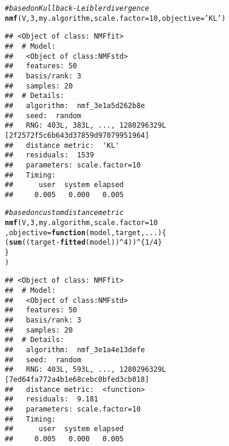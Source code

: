 \documentclass[a4paper]{article}\usepackage[]{graphicx}\usepackage[]{color}
\makeatletter
\newcommand{\hlnum}[1]{\textcolor[rgb]{0.686,0.059,0.569}{#1}}%
\newcommand{\hlstr}[1]{\textcolor[rgb]{0.192,0.494,0.8}{#1}}%
\newcommand{\hlcom}[1]{\textcolor[rgb]{0.678,0.584,0.686}{\textit{#1}}}%
\newcommand{\hlopt}[1]{\textcolor[rgb]{0,0,0}{#1}}%
\newcommand{\hlstd}[1]{\textcolor[rgb]{0.345,0.345,0.345}{#1}}%
\newcommand{\hlkwa}[1]{\textcolor[rgb]{0.161,0.373,0.58}{\textbf{#1}}}%
\newcommand{\hlkwc}[1]{\textcolor[rgb]{0.333,0.667,0.333}{#1}}%
\newcommand{\hlkwd}[1]{\textcolor[rgb]{0.737,0.353,0.396}{\textbf{#1}}}%
\newenvironment{kframe}{%
 \def\at@end@of@kframe{}%
 \ifinner\ifhmode%
  \def\at@end@of@kframe{\end{minipage}}%
  \begin{minipage}{\columnwidth}%
 \fi\fi%
 \def\FrameCommand##1{\hskip\@totalleftmargin \hskip-\fboxsep
 \colorbox{shadecolor}{##1}\hskip-\fboxsep
     \hskip-\linewidth \hskip-\@totalleftmargin \hskip\columnwidth}%
 \MakeFramed {\advance\hsize-\width
   \@totalleftmargin\z@ \linewidth\hsize
   \@setminipage}}%
 {\par\unskip\endMakeFramed%
 \at@end@of@kframe}
\newenvironment{knitrout}{}{} %
\makeatother
\begin{document}
\begin{knitrout}
\color{fgcolor}\begin{kframe}
\begin{alltt}
\hlcom{# based on Kullback-Leibler divergence}
\hlkwd{nmf}\hlstd{(V,} \hlnum{3}\hlstd{, my.algorithm,} \hlkwc{scale.factor}\hlstd{=}\hlnum{10}\hlstd{,} \hlkwc{objective}\hlstd{=}\hlstr{'KL'}\hlstd{)}
\end{alltt}
\begin{verbatim}
## <Object of class: NMFfit>
##  # Model:
##   <Object of class:NMFstd>
##   features: 50 
##   basis/rank: 3 
##   samples: 20 
##  # Details:
##   algorithm:  nmf_3e1a5d262b8e 
##   seed:  random 
##   RNG: 403L, 383L, ..., 1280296329L [2f2572f5c6b643d37859d97079951964]
##   distance metric:  'KL' 
##   residuals:  1539 
##   parameters: scale.factor=10 
##   Timing:
##      user  system elapsed 
##     0.005   0.000   0.005
\end{verbatim}
\begin{alltt}
\hlcom{# based on custom distance metric}
\hlkwd{nmf}\hlstd{(V,} \hlnum{3}\hlstd{, my.algorithm,} \hlkwc{scale.factor}\hlstd{=}\hlnum{10}
        \hlstd{,} \hlkwc{objective}\hlstd{=}\hlkwa{function}\hlstd{(}\hlkwc{model}\hlstd{,} \hlkwc{target}\hlstd{,} \hlkwc{...}\hlstd{)\{}
            \hlstd{(} \hlkwd{sum}\hlstd{( (target}\hlopt{-}\hlkwd{fitted}\hlstd{(model))}\hlopt{^}\hlnum{4} \hlstd{) )}\hlopt{^}\hlstd{\{}\hlnum{1}\hlopt{/}\hlnum{4}\hlstd{\}}
                \hlstd{\}}
\hlstd{)}
\end{alltt}
\begin{verbatim}
## <Object of class: NMFfit>
##  # Model:
##   <Object of class:NMFstd>
##   features: 50 
##   basis/rank: 3 
##   samples: 20 
##  # Details:
##   algorithm:  nmf_3e1a4e13defe 
##   seed:  random 
##   RNG: 403L, 593L, ..., 1280296329L [7ed64fa772a4b1e68cebc0bfed3cb018]
##   distance metric:  <function> 
##   residuals:  9.181 
##   parameters: scale.factor=10 
##   Timing:
##      user  system elapsed 
##     0.005   0.000   0.005
\end{verbatim}
\end{kframe}
\end{knitrout}

%
%
\end{document}

